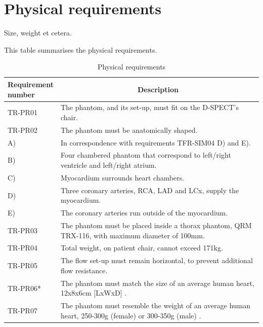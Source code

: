 \section{Physical requirements}
Size, weight et cetera.
\begin{table} [H]
\caption{Physical requirements}
\label{tab:physrec}
This table summarises the physical requirements.
\begin{tabular}{l|p{120mm}|}
	\makecell[l]{\textbf{Requirement} \\ \textbf{number}} & \multicolumn{1}{c}{\textbf{Description}}\\
	\hline
	TR-PR01 & The phantom, and its set-up, must fit on the D-SPECT's chair. \\
	TR-PR02 & The phantom must be anatomically shaped. \\
	\hspace{1.5cm} A) & In correspondence with requirements TFR-SIM04 D) and E). \\
	\hspace{1.5cm} B) & Four chambered phantom that correspond to left/right ventricle and left/right atrium. \\
	\hspace{1.5cm} C) & Myocardium surrounds heart chambers. \\
	\hspace{1.5cm} D) & Three coronary arteries, RCA, LAD and LCx, supply the myocardium. \\
	\hspace{1.5cm} E) & The coronary arteries run outside of the myocardium. \\
	TR-PR03 & The phantom must be placed inside a thorax phantom, QRM TRX-116, with maximum diameter of 100mm. \\
	TR-PR04 & Total weight, on patient chair, cannot exceed 171kg. \\
	TR-PR05 & The flow set-up must remain horizontal, to prevent additional flow resistance. \\
	TR-PR06* & The phantom must match the size of an average human heart, 12x8x6cm [LxWxD] \citep{openstax2013anatomy}. \\
	TR-PR07 & The phantom must resemble the weight of an average human heart, 250-300g (female) or 300-350g (male) \citep{openstax2013anatomy}. \\

\end{tabular}
\end{table}
